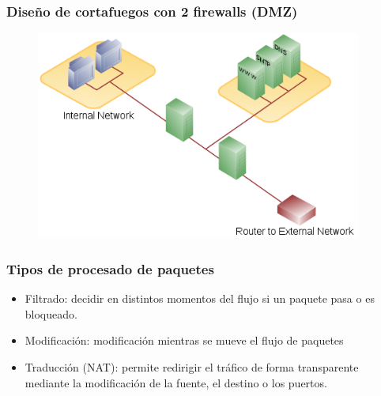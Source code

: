\documentclass{beamer}
\begin{document}

\begin{frame}
\frametitle{Diseño de cortafuegos con 2 firewalls (DMZ)}

\begin{figure}[h]

\begin{center}
  \centering
  \includegraphics[height=2.7in]{figs/500px-DMZ_network_diagram_2_firewall.png}
\end{center}
\end{figure}

\end{frame}



\begin{frame}
\frametitle{Tipos de procesado de paquetes}

\begin{itemize}
\item \alert{Filtrado:} decidir en distintos momentos del flujo si un paquete pasa o es bloqueado.
\item \alert{Modificación:} modificación mientras se mueve el flujo de paquetes
\item \alert{Traducción (NAT)}: permite redirigir el tráfico de forma transparente mediante la modificación de la fuente, el destino o los puertos.
\end{itemize}

\end{frame}

\end{document}
